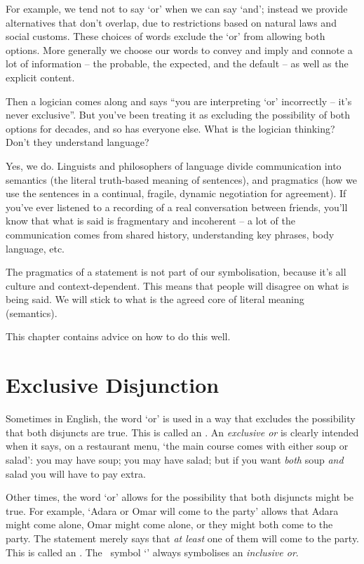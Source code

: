 \documentclass[PHIL101-Textbook.tex]{subfiles}
\begin{document}
For example, we tend not to say `or' when we can say `and'; instead we provide alternatives that don't overlap, due to restrictions based on natural laws and social customs. These choices of words exclude the `or' from allowing both options. More generally we choose our words to convey and imply and connote a lot of information -- the probable, the expected, and the default -- as well as the explicit content.

Then a logician comes along and says ``you are interpreting `or' incorrectly -- it's never exclusive''. But you've been treating it as excluding the possibility of both options for decades, and so has everyone else. What is the logician thinking? Don't they understand language?

Yes, we do. Linguists and philosophers of language divide communication into semantics (the literal truth-based meaning of sentences), and pragmatics (how we use the sentences in a continual, fragile, dynamic negotiation for agreement). If you've ever listened to a recording of a real conversation between friends, you'll know that what is said is fragmentary and incoherent -- a lot of the communication comes from shared history, understanding key phrases, body language, etc.

The pragmatics of a statement is not part of our symbolisation, because it's all culture and context-dependent. This means that people will disagree on what is being said. We will stick to what is the agreed core of literal meaning (semantics).

This chapter contains advice on how to do this well.


\section{Exclusive Disjunction}

Sometimes in English, the word `or' is used in a way that excludes the possibility that both disjuncts are true. This is called an .  An \emph{exclusive or} is clearly intended when it says, on a restaurant menu, `the main course comes with either soup or salad': you may have soup; you may have salad; but if you want \emph{both} soup \emph{and} salad you will have to pay extra.

Other times, the word `or' allows for the possibility that both disjuncts might be true. For example, `Adara or Omar will come to the party' allows that Adara might come alone, Omar might come alone, or they might both come to the party. The statement merely says that \emph{at least} one of them will come to the party. This is called an . The \tfl\ symbol `\eor' always symbolises an \emph{inclusive or}.
\end{document}
